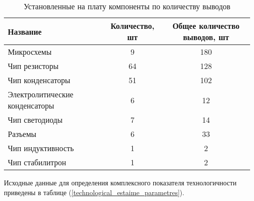 \documentclass{article}
\begin{document}
\begin{table}
    \centering
    \begin{tabular}{|l|c|c|}
        \hline
        Название & Количество, шт & Общее количество выводов, шт \\ \hline
        Микросхемы & 9 & 180 \\ \hline
        Чип резисторы & 64 & 128 \\ \hline
        Чип конденсаторы & 51 & 102 \\ \hline
        Электролитические конденсаторы & 6 & 12 \\ \hline
        Чип светодиоды & 7 & 14 \\ \hline
        Разъемы & 6 & 33 \\ \hline
        Чип индуктивность & 1 & 2 \\ \hline
        Чип стабилитрон & 1 & 2 \\ \hline
    \end{tabular}
    \caption{Установленные на плату компоненты по количеству выводов}
    \label{components_and_mount_points}
\end{table}

Исходные данные для определения комплексного показателя технологичности
приведены в таблице (\ref{technological_estaime_parametres}).
\end{document}
